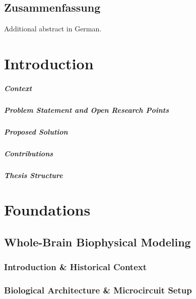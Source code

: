 \documentclass[
    english,
	ruledheaders=section,%
	class=report,%
	thesis={type=master},%
	accentcolor=2c, %
	custommargins=false,
	marginpar=false,
	BCOR=10mm, %
	parskip=half-, %
	fontsize=11pt, %
  	twoside,
  	numbers=noendperiod,
  	fleqn,
  	captions=oneline, %
	captions=tableheading, %
  	IMRAD=false
]{tudapub}
\begin{document}
\section*{Zusammenfassung}
	Additional abstract in German.

\cleardoublepage

\tableofcontents
\cleardoublepage

\mainmatter

\chapter{Introduction}
\paragraph{Context}
\paragraph{Problem Statement and Open Research Points}
\paragraph{Proposed Solution}
\paragraph{Contributions}
\paragraph{Thesis Structure}

\chapter{Foundations}
\section{Whole-Brain Biophysical Modeling}

\subsection{Introduction \& Historical Context}

\subsection{Biological Architecture \& Microcircuit Setup}
\end{document}
